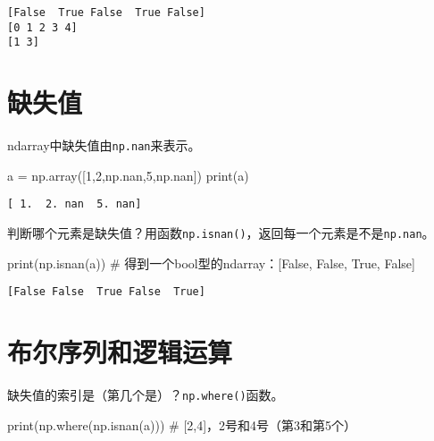 \documentclass[
  letterpaper,
  DIV=11,
  numbers=noendperiod]{scrreprt}
\newenvironment{Shaded}{\begin{snugshade}}{\end{snugshade}}
\newcommand{\BuiltInTok}[1]{\textcolor[rgb]{0.00,0.23,0.31}{#1}}
\newcommand{\CommentTok}[1]{\textcolor[rgb]{0.37,0.37,0.37}{#1}}
\newcommand{\DecValTok}[1]{\textcolor[rgb]{0.68,0.00,0.00}{#1}}
\newcommand{\NormalTok}[1]{\textcolor[rgb]{0.00,0.23,0.31}{#1}}
\newcommand{\OperatorTok}[1]{\textcolor[rgb]{0.37,0.37,0.37}{#1}}
\begin{document}
\begin{verbatim}
[False  True False  True False]
[0 1 2 3 4]
[1 3]
\end{verbatim}

\hypertarget{ux7f3aux5931ux503c}{%
\section{缺失值}\label{ux7f3aux5931ux503c}}

ndarray中缺失值由\texttt{np.nan}来表示。

\begin{Shaded}
\begin{Highlighting}[]
\NormalTok{a }\OperatorTok{=}\NormalTok{ np.array([}\DecValTok{1}\NormalTok{,}\DecValTok{2}\NormalTok{,np.nan,}\DecValTok{5}\NormalTok{,np.nan])}
\BuiltInTok{print}\NormalTok{(a)}
\end{Highlighting}
\end{Shaded}

\begin{verbatim}
[ 1.  2. nan  5. nan]
\end{verbatim}

判断哪个元素是缺失值？用函数\texttt{np.isnan()}，返回每一个元素是不是\texttt{np.nan}。

\begin{Shaded}
\begin{Highlighting}[]
\BuiltInTok{print}\NormalTok{(np.isnan(a)) }\CommentTok{\# 得到一个bool型的ndarray：[False, False,  True, False]}
\end{Highlighting}
\end{Shaded}

\begin{verbatim}
[False False  True False  True]
\end{verbatim}

\hypertarget{ux5e03ux5c14ux5e8fux5217ux548cux903bux8f91ux8fd0ux7b97}{%
\section{布尔序列和逻辑运算}\label{ux5e03ux5c14ux5e8fux5217ux548cux903bux8f91ux8fd0ux7b97}}

缺失值的索引是（第几个是）？\texttt{np.where()}函数。

\begin{Shaded}
\begin{Highlighting}[]
\BuiltInTok{print}\NormalTok{(np.where(np.isnan(a))) }\CommentTok{\# [2,4]，2号和4号（第3和第5个）}
\end{Highlighting}
\end{Shaded}
\end{document}
